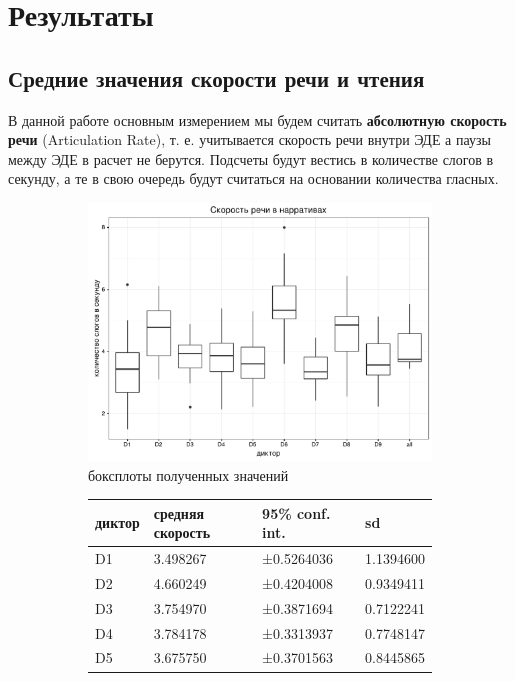 \section{Результаты}
\subsection{Средние значения скорости речи и чтения}
\noindent В данной работе основным измерением мы будем считать \textbf{абсолютную скорость речи} (Articulation Rate), т. е. учитывается скорость речи внутри ЭДЕ а паузы между ЭДЕ в расчет не берутся. Подсчеты будут вестись в количестве слогов в секунду, а те в свою очередь будут считаться на основании количества гласных.
\begin{figure}[t]
\begin{subfigure}[b]{0.53\textwidth}
        \includegraphics[width=\linewidth]{narrativeboxplot.pdf}
        \caption{боксплоты полученных значений}
\end{subfigure}
\hfill
\begin{subfigure}[b]{0.45\textwidth}
\small
\begin{tabular}{|l|l|l|l|}
\hline
диктор & средняя скорость & 95\% conf. int. & sd \\ \hline
D1 & 3.498267 & ±0.5264036 & 1.1394600 \\ \hline
D2 & 4.660249 & ±0.4204008 & 0.9349411 \\ \hline
D3 & 3.754970 & ±0.3871694 & 0.7122241 \\ \hline
D4 & 3.784178 & ±0.3313937 & 0.7748147 \\ \hline
D5 & 3.675750 & ±0.3701563 & 0.8445865 \\ \hline

\end{tabular}
\end{subfigure}
\end{figure}

